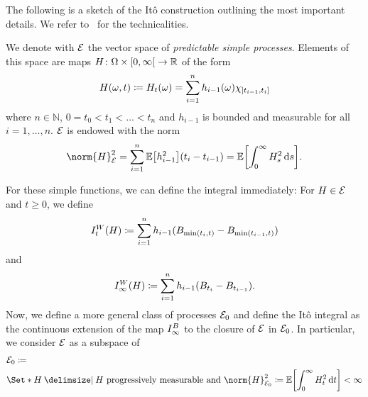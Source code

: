 The following is a sketch of the Itô construction outlining the most important details.
We refer to~\cite[chapter 25]{Klenke2014} for the technicalities.
\begin{definition}%
	\label{def:predictable simple processes}
	We denote with \( \mathcal{E} \) the vector space of \emph{predictable simple processes}.
	Elements of this space are maps \( \map{H}{\Omega \times \rinterval{\num{0}}{\infty}}{\R} \) of the form
	\begin{equation}
		H(\omega, t) \coloneqq H_t(\omega) = \sum_{i=\num{1}}^n h_{i-\num{1}}(\omega)\CharacteristicFunction{\linterval{t_{i-\num{1}}}{t_i}}
	\end{equation}
	where \( n \in \mathbb{N} \), \( \num{0} = t_{\num{0}} < t_{\num{1}} < \ldots < t_n \) and \( h_{i-\num{1}} \) is bounded and measurable for all \( i = \num{1}, \dotsc, n \).
	\( \mathcal{E} \) is endowed with the norm
	\begin{equation}
		\norm{H}_{\PredictableSimpleProcesses}^{\num{2}} = \sum_{i=\num{1}}^n \Expectation\bigl[ h_{i-\num{1}}^{\num{2}} \bigr](t_i - t_{i-\num{1}}) = \Expectation\biggl[ \int_{\num{0}}^\infty H_s^{\num{2}}\,\mathrm{d}s \biggr].
	\end{equation}
\end{definition}
For these simple functions, we can define the integral immediately:
For \( H \in \mathcal{E} \) and \( t \geq \num{0} \), we define
\begin{equation}
	I_t^W(H) \coloneqq \sum_{i=\num{1}}^n h_{i-\num{1}}(B_{\min(t_i,t)} - B_{\min(t_{i-\num{1}}, t)})
\end{equation}
and
\begin{equation}
	I_\infty^W(H) \coloneqq \sum_{i=\num{1}}^n h_{i-\num{1}}(B_{t_i} - B_{t_{i-\num{1}}}).
\end{equation}
Now, we define a more general class of processes \( \mathcal{E}_{\num{0}} \) and define the Itô integral as the continuous extension of the map \( I_\infty^B \) to the closure of \( \mathcal{E} \) in \( \mathcal{E}_{\num{0}} \).
In particular, we consider \( \mathcal{E} \) as a subspace of
\begin{equation}
	\begin{aligned}
		&\PredictableSimpleProcesses_{\num{0}} \coloneqq \\
		&\Set*{H\given H \text{ progressively measurable and } \norm{H}_{\PredictableSimpleProcesses_{\num{0}}}^{\num{2}} \coloneqq \Expectation\biggl[ \int_{\num{0}}^\infty H^{\num{2}}_t\,\mathrm{d}t \biggr] < \infty}
	\end{aligned}
\end{equation}
